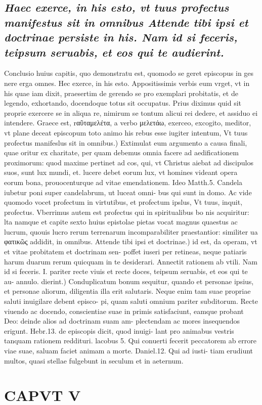 \documentclass{article}
\begin{document}
\begin{pages}
\subsection*{\textit{Haec exerce, in his esto, vt tuus profectus manifestus sit in omnibus Attende tibi ipsi et doctrinae persiste in his. Nam id si feceris, teipsum seruabis, et eos qui te audierint. }}\pstart Conclusio huius capitis, quo demonstratu est, quomodo se geret episcopus in ges nere erga omnes.  \pend\pstart Hec exerce, in his esto. Appositissimis verbis eum vrget, vt in his quae iam dixit, praesertim de gerendo se pro exemplari probitatis, et de legendo, exhortando, docendoque totus sit occupatus. Prius diximus quid sit proprie exercere se in aliqua re, nimirum se tontum alicui rei dedere, et assiduo ei intendere. Graece est, rαῦταμελέτα, a verbo μελετάω, exerceo, excogito, meditor, vt plane deceat episcopum toto animo his rebus esse iugiter intentum, Vt tuus profectus manifeslus sit in omnibus.) Extimulat eum argumento a causa finali, quae oritur ex charitate, per quam debemus omnia facere ad aedificationem proximorum: quod maxime pertinet ad cos, qui, vt Christus aiebat ad discipulos suos, sunt lux mundi, et. lucere debet eorum lux, vt homines videant opera eorum bona, prouocenturque ad vitae emendationem. Ideo Matth.5. Candela iubetur poni super candelabrum, ut luceat omni- bus qui sunt in domo. Ac vide quomodo vocet profectum in virtutibus, et profectum ipslus, Vt tuus, inquit, profectus. Vberrimus autem est profectus qui in spiritualibus bo nis acquiritur: lta namque et capite sexto huius epistolae pietas vocat magnus quaestus ac lucrum, quouis lucro rerum terrenarum incomparabiliter praestantior: similiter ua φατικῶς addidit, in omnibus.  \pend\pstart Attende tibi ipsi et doctrinae.) id est, da operam, vt et vitae probitatem et doctrinam sen- poffet iuseri per retineas, neque patiaris harum duarum rerum quicquam in te desiderari. Annectit rationem ab vtili.  \pend\pstart Nam id si feceris. I. pariter recte viuis et recte doces, teipsum seruabis, et eos qui te au- annulo. dierint.) Conduplicatum bonum sequitur, quando et personae ipsius, et personae aliorum, diligentia illa erit salutaris. Neque enim tam suae propriae saluti inuigilare debent episco- pi, quam saluti omnium pariter subditorum. Recte viuendo ac docendo, conscientiae suae in primis satisfaciunt, eamque probant Deo: deinde alios ad doctrinam suam am- plectendam ac mores insequendos erigunt. Hebr.13. de episcopis dicit, quod inuigi- lant pro animabus vestris tanquam rationem reddituri. lacobus 5. Qui conuerti fecerit peccatorem ab errore viae suae, saluam faciet animam a morte. Daniel.12. Qui ad iusti- tiam erudiunt multos, quasi stellae fulgebunt in seculum et in aeternum.  \pend
\endnumbering\beginnumbering\section{CAPVT V}
{}

\end{pages}
\end{document}
